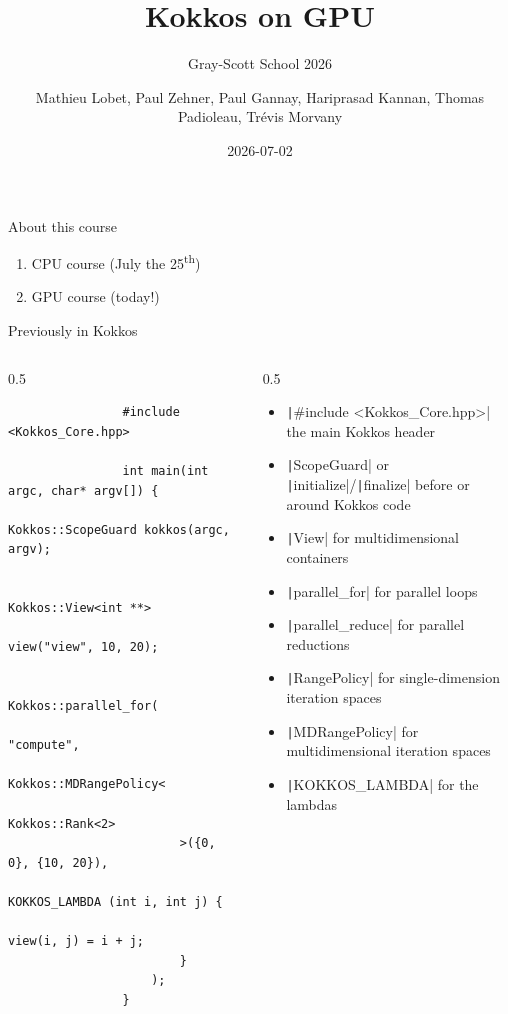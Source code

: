 \documentclass[
    aspectratio=169,
]{beamer}
\title{Kokkos on GPU}
\subtitle{Gray-Scott School 2026}
\author{Mathieu Lobet, Paul Zehner, Paul Gannay, Hariprasad Kannan, Thomas Padioleau, Trévis Morvany}
\institute{CEA}
\date{2026-07-02}
\begin{document}
\begin{frame}[plain]
    \titlepage
\end{frame}

\begin{frame}{About this course}
    \begin{enumerate}
        \item CPU course (July the 25\textsuperscript{th})
        \item GPU course (today!)
    \end{enumerate}
\end{frame}

\begin{frame}[fragile]{Previously in Kokkos}
    \vspace{-1em}

    \begin{columns}
        \begin{column}{0.5\linewidth}
            \begin{verbatim}
                #include <Kokkos_Core.hpp>

                int main(int argc, char* argv[]) {
                    Kokkos::ScopeGuard kokkos(argc, argv);

                    Kokkos::View<int **>
                        view("view", 10, 20);

                    Kokkos::parallel_for(
                        "compute",
                        Kokkos::MDRangePolicy<
                            Kokkos::Rank<2>
                        >({0, 0}, {10, 20}),
                        KOKKOS_LAMBDA (int i, int j) {
                            view(i, j) = i + j;
                        }
                    );
                }
            \end{verbatim}
        \end{column}
        \begin{column}{0.5\linewidth}
            \small
            \begin{itemize}
                \item \texttt|#include <Kokkos_Core.hpp>| the main Kokkos header
                \item \texttt|ScopeGuard| or \texttt|initialize|/\break\texttt|finalize| before or around Kokkos code
                \item \texttt|View| for multidimensional containers
                \item \texttt|parallel_for| for parallel loops
                \item \texttt|parallel_reduce| for parallel reductions
                \item \texttt|RangePolicy| for single-dimension iteration spaces
                \item \texttt|MDRangePolicy| for multidimensional iteration spaces
                \item \texttt|KOKKOS_LAMBDA| for the lambdas
            \end{itemize}
        \end{column}
    \end{columns}
\end{frame}
\end{document}
